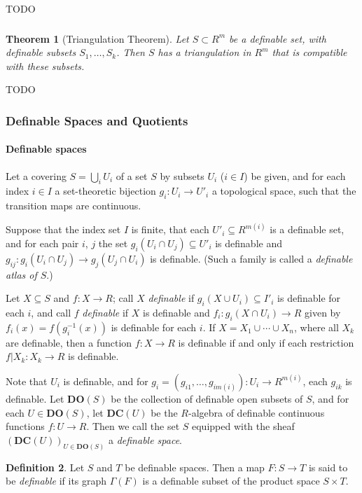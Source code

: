 \documentclass{amsart}
\newtheorem{theorem}{Theorem}[section]
\theoremstyle{definition}
\newtheorem{definition}[theorem]{Definition}
\numberwithin{equation}{section}
\begin{document}
TODO

\subsubsection{}
\begin{theorem}[Triangulation Theorem]
    Let $S \subset R^m$ be a definable set,
    with definable subsets $S_1,\dots,S_k$.
    Then $S$ has a triangulation in $R^m$ that is compatible with these subsets.
\end{theorem}

TODO

\subsubsection{Definable Spaces and Quotients}
\paragraph{\bfseries Definable spaces}
Let a covering $S = \bigcup_i U_i$ of a set $S$ by subsets $U_i$ ($i\in I$) be given,
and for each index $i \in I$ a set-theoretic bijection $g_i: U_i \to U'_i$ a topological space,
such that the transition maps are continuous.

Suppose that the index set $I$ is finite,
that each $U'_i \subseteq R^{m(i)}$ is a definable set,
and for each pair $i$, $j$ the set $g_i(U_i\cap U_j) \subseteq U'_i$
is definable and $g_{ij}: g_i(U_i\cap U_j) \to g_j(U_j\cap U_i)$ is definable.
(Such a family is called a \emph{definable atlas of $S$}.)

Let $X \subseteq S$ and $f : X \to R$;
call $X$ \emph{definable} if $g_i(X\cup U_i) \subseteq I'_i$ is definable for each $i$,
and call $f$ \emph{definable} if $X$ is definable and 
$f_i : g_i(X \cap U_i) \to R$ given by $f_i(x) = f(g_i^{-1}(x))$ is definable for each $i$.
If $X = X_1\cup \cdots \cup X_n$,
where all $X_k$ are definable,
then a function $f: X \to R$ is definable if and only if each restriction $f|X_k: X_k \to R$ is definable.

Note that $U_i$ is definable,
and for $g_i = (g_{i1},\dots,g_{im(i)}) : U_i \to R^{m(i)}$,
each $g_{ik}$ is definable.
Let $\mathbf{DO}(S)$ be the collection of definable open subsets of $S$,
and for each $U \in \mathbf{DO}(S)$,
let $\mathbf{DC}(U)$ be the $R$-algebra of definable continuous functions $f: U \to R$.
Then we call the set $S$ equipped with the sheaf $(\mathbf{DC}(U))_{U \in \mathbf{DO}(S)}$ a \emph{definable space}.

\begin{definition}
    Let $S$ and $T$ be definable spaces.
    Then a map $F: S \to T$ is said to be \emph{definable} if its graph $\Gamma(F)$ is a definable subset of the product space $S \times T$.
\end{definition}
\end{document}
